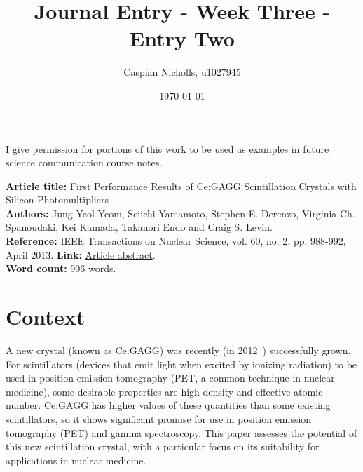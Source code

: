 \documentclass[12pt,a4paper]{article}
\begin{document}
\title{Journal Entry - Week Three - Entry Two}
\author{Caspian Nicholls, u1027945}
\date{\today}

\maketitle

\noindent
I give permission for portions of this work to be used as examples in future science communication course notes.

\medskip
\noindent
\textbf{Article title:} First Performance Results of Ce:GAGG Scintillation Crystals with Silicon Photomultipliers \\
\textbf{Authors:} Jung Yeol Yeom, Seiichi Yamamoto, Stephen E. Derenzo, Virginia Ch. Spanoudaki, Kei Kamada, Takanori Endo and Craig S. Levin. \\
\textbf{Reference:} IEEE Transactions on Nuclear Science, vol. 60, no. 2, pp. 988-992, April 2013.
\textbf{Link:}  \href{https://ieeexplore.ieee.org/document/6428666}{Article abstract}. \\
\textbf{Word count:} 906 words.

\section*{Context}

A new crystal (known as Ce:GAGG) was recently (in 2012~\cite{kamada_2inch_2012}) successfully grown. For scintillators (devices that emit light when excited by ionizing radiation) to be used in position emission tomography (PET, a common technique in nuclear medicine), some desirable properties are high density and effective atomic number. 
Ce:GAGG has higher values of these quantities than some existing scintillators, so it shows significant promise for use in position emission tomography (PET) and gamma spectroscopy. 
This paper assesses the potential of this new scintillation crystal, with a particular focus on its suitability for applications in nuclear medicine.
\end{document}
